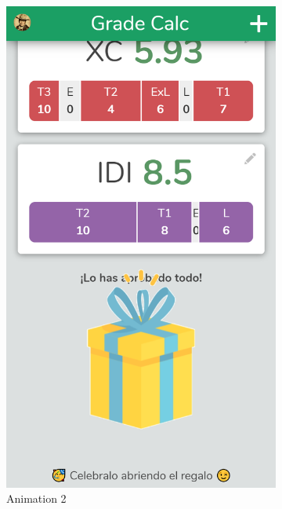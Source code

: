 \begin{figure}[htbp!]
\begin{subfigure}[b]{0.23\textwidth-0.1cm}
        \includegraphics[width=\textwidth]{media/screenshots/screenshot-gift-2.png}
        \caption{Animation 2}
    \end{subfigure}
    \begin{subfigure}[b]{0.23\textwidth-0.1cm}
        \centering

\end{subfigure}
\end{figure}
